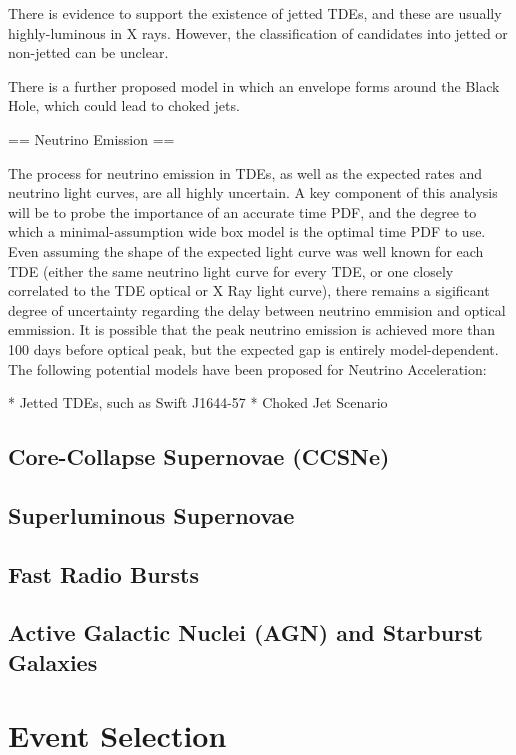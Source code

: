 \documentclass[]{article}
\begin{document}
There is evidence to support the existence of jetted TDEs, and these are usually highly-luminous in X rays. However, the classification of candidates into jetted or non-jetted can be unclear.

There is a further proposed model in which an envelope forms around the Black Hole, which could lead to choked jets.

== Neutrino Emission ==

The process for neutrino emission in TDEs, as well as the expected rates and neutrino light curves, are all highly uncertain. A key component of this analysis will be to probe the importance of an accurate time PDF, and the degree to which a minimal-assumption wide box model is the optimal time PDF to use. Even assuming the shape of the expected light curve was well known for each TDE (either the same neutrino light curve for every TDE,  or one closely correlated to the TDE optical or X Ray light curve), there remains a sigificant degree of uncertainty regarding the delay between neutrino emmision and optical emmission. It is possible that the peak neutrino emission is achieved more than 100 days before optical peak, but the expected gap is entirely model-dependent. The following potential models have been proposed for Neutrino Acceleration:

* Jetted TDEs, such as Swift J1644-57
* Choked Jet Scenario

\subsection{Core-Collapse Supernovae (CCSNe)}

\subsection{Superluminous Supernovae}

\subsection{Fast Radio Bursts}

\subsection{Active Galactic Nuclei (AGN) and Starburst Galaxies}

\section{Event Selection}
\end{document}
